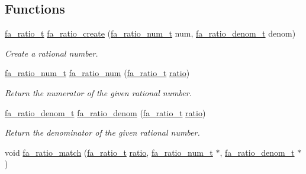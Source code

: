 \subsection*{Functions}
\begin{DoxyCompactItemize}
\item 
\hyperlink{group___fa_ratio_gaf3b37b5fdfcccb6283b7ac806c72b273}{fa\-\_\-ratio\-\_\-t} \hyperlink{group___fa_ratio_ga3ab0d3fea73d05b4173e066f954389a5}{fa\-\_\-ratio\-\_\-create} (\hyperlink{group___fa_ratio_ga6d6962b946d96535558e341030f16e07}{fa\-\_\-ratio\-\_\-num\-\_\-t} num, \hyperlink{group___fa_ratio_ga18626f0c26ea1666ce0725605044cfa1}{fa\-\_\-ratio\-\_\-denom\-\_\-t} denom)
\begin{DoxyCompactList}\small\item\em Create a rational number. \end{DoxyCompactList}\item 
\hyperlink{group___fa_ratio_ga6d6962b946d96535558e341030f16e07}{fa\-\_\-ratio\-\_\-num\-\_\-t} \hyperlink{group___fa_ratio_gaa94661f5ff09ed1a547f870f6e1c5a9b}{fa\-\_\-ratio\-\_\-num} (\hyperlink{group___fa_ratio_gaf3b37b5fdfcccb6283b7ac806c72b273}{fa\-\_\-ratio\-\_\-t} \hyperlink{util_8h_a866d3cbbee2679ec3c34f27a256445de}{ratio})
\begin{DoxyCompactList}\small\item\em Return the numerator of the given rational number. \end{DoxyCompactList}\item 
\hyperlink{group___fa_ratio_ga18626f0c26ea1666ce0725605044cfa1}{fa\-\_\-ratio\-\_\-denom\-\_\-t} \hyperlink{group___fa_ratio_ga71fb6b16111090ebef75fce0a62eb234}{fa\-\_\-ratio\-\_\-denom} (\hyperlink{group___fa_ratio_gaf3b37b5fdfcccb6283b7ac806c72b273}{fa\-\_\-ratio\-\_\-t} \hyperlink{util_8h_a866d3cbbee2679ec3c34f27a256445de}{ratio})
\begin{DoxyCompactList}\small\item\em Return the denominator of the given rational number. \end{DoxyCompactList}\item 
void \hyperlink{group___fa_ratio_gacb1ec6f18e009d96c398f83e7a507270}{fa\-\_\-ratio\-\_\-match} (\hyperlink{group___fa_ratio_gaf3b37b5fdfcccb6283b7ac806c72b273}{fa\-\_\-ratio\-\_\-t} \hyperlink{util_8h_a866d3cbbee2679ec3c34f27a256445de}{ratio}, \hyperlink{group___fa_ratio_ga6d6962b946d96535558e341030f16e07}{fa\-\_\-ratio\-\_\-num\-\_\-t} $\ast$, \hyperlink{group___fa_ratio_ga18626f0c26ea1666ce0725605044cfa1}{fa\-\_\-ratio\-\_\-denom\-\_\-t} $\ast$)

\end{DoxyCompactItemize}

